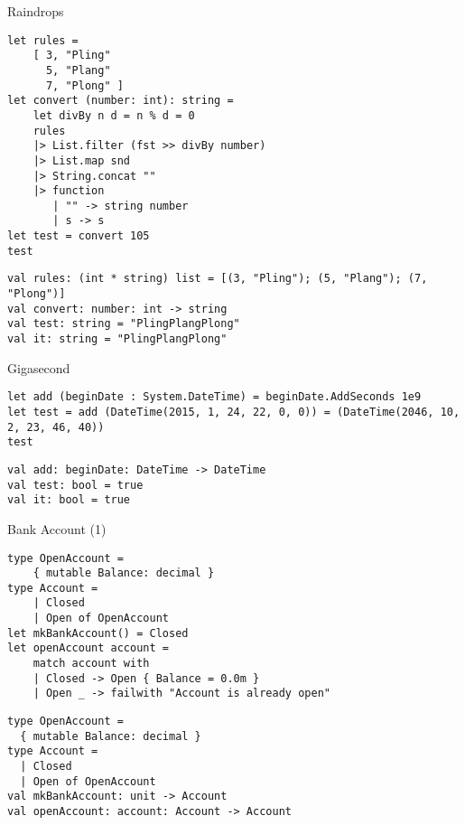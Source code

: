 \documentclass[t]{beamer}
\begin{document}
\begin{frame}[label={sec:orgff015bd},fragile]{Raindrops}
 \begin{verbatim}
let rules =
    [ 3, "Pling"
      5, "Plang"
      7, "Plong" ]
let convert (number: int): string =
    let divBy n d = n % d = 0
    rules
    |> List.filter (fst >> divBy number)
    |> List.map snd
    |> String.concat ""
    |> function
       | "" -> string number
       | s -> s
let test = convert 105
test
\end{verbatim}

\begin{verbatim}
val rules: (int * string) list = [(3, "Pling"); (5, "Plang"); (7, "Plong")]
val convert: number: int -> string
val test: string = "PlingPlangPlong"
val it: string = "PlingPlangPlong"
\end{verbatim}
\end{frame}

\begin{frame}[label={sec:orgbaa4345},fragile]{Gigasecond}
 \begin{verbatim}
let add (beginDate : System.DateTime) = beginDate.AddSeconds 1e9
let test = add (DateTime(2015, 1, 24, 22, 0, 0)) = (DateTime(2046, 10, 2, 23, 46, 40))
test
\end{verbatim}

\begin{verbatim}
val add: beginDate: DateTime -> DateTime
val test: bool = true
val it: bool = true
\end{verbatim}
\end{frame}

\begin{frame}[label={sec:orgd85fcd5},fragile]{Bank Account (1)}
 \begin{verbatim}
type OpenAccount =
    { mutable Balance: decimal }
type Account =
    | Closed
    | Open of OpenAccount
let mkBankAccount() = Closed
let openAccount account =
    match account with
    | Closed -> Open { Balance = 0.0m }
    | Open _ -> failwith "Account is already open"
\end{verbatim}

\begin{verbatim}
type OpenAccount =
  { mutable Balance: decimal }
type Account =
  | Closed
  | Open of OpenAccount
val mkBankAccount: unit -> Account
val openAccount: account: Account -> Account
\end{verbatim}
\end{frame}
\end{document}
